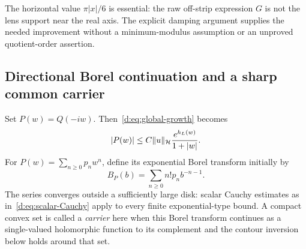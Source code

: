 \documentclass[11pt,a4paper]{article}
\numberwithin{equation}{section}
\theoremstyle{definition}\newtheorem{definition}[theorem]{Definition}
\theoremstyle{remark}\newtheorem{remark}[theorem]{Remark}
\newcommand{\Hh}{\mathcal H}\newcommand{\Hw}{\mathcal H}
\begin{document}
The horizontal value $\pi|x|/6$ is essential: the raw off-strip expression $G$ is not the lens support near the real axis. The explicit damping argument supplies the needed improvement without a minimum-modulus assumption or an unproved quotient-order assertion.

\subsection{Directional Borel continuation and a sharp common carrier}\label{d:sec:Borel}

Set $P(w)=Q(-iw)$. Then~\eqref{d:eq:global-growth} becomes
\begin{equation}\label{d:eq:P-growth}
 |P(w)|\le C\norm{u}_{\Hh}\frac{e^{h_L(w)}}{1+|w|}.
\end{equation}
For $P(w)=\sum_{n\ge0}p_nw^n$, define its exponential Borel transform initially by
\begin{equation}\label{d:eq:B-series}
 B_P(b)=\sum_{n\ge0}n!p_n b^{-n-1}.
\end{equation}
The series converges outside a sufficiently large disk: scalar Cauchy estimates as in~\eqref{d:eq:scalar-Cauchy} apply to every finite exponential-type bound. A compact convex set is called a \emph{carrier} here when this Borel transform continues as a single-valued holomorphic function to its complement and the contour inversion below holds around that set.
\end{document}
